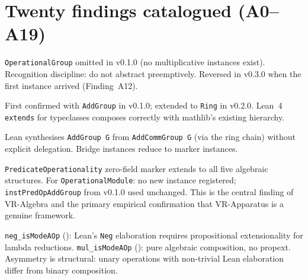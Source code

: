 \section{Twenty findings catalogued (A0--A19)}
\label{sec:algebra_findings}

\begin{finding}
\label{finding:A0}
\leanok
{}
\texttt{OperationalGroup} omitted in v0.1.0 (no multiplicative instances
exist).  Recognition discipline: do not abstract preemptively.
Reversed in v0.3.0 when the first instance arrived (Finding~A12).
\end{finding}

\begin{finding}
\label{finding:A1}
\leanok
First confirmed with \texttt{AddGroup} in v0.1.0;
extended to \texttt{Ring} in v0.2.0.
Lean~4 \texttt{extends} for typeclasses composes correctly with
mathlib's existing hierarchy.
\end{finding}

\begin{finding}[A2 --- \texttt{toAddGroup := inferInstance} resolves bridge]
\label{finding:A2}
\leanok
Lean synthesises \texttt{AddGroup G} from \texttt{AddCommGroup G} (via the
ring chain) without explicit delegation.  Bridge instances reduce to
marker instances.
\end{finding}

\begin{finding}
\label{finding:A3}
\leanok
{}
\texttt{PredicateOperationality} zero-field marker extends to all five
algebraic structures.  For \texttt{OperationalModule}: no new instance
registered; \texttt{instPredOpAddGroup} from v0.1.0 used unchanged.
This is the central finding of VR-Algebra and the primary empirical
confirmation that VR-Apparatus is a genuine framework.
\end{finding}

\begin{finding}
\label{finding:A4}
\leanok
{}
\texttt{neg\_isModeAOp} (\axiomprofile{[propext]}): Lean's \texttt{Neg}
elaboration requires propositional extensionality for lambda reductions.
\texttt{mul\_isModeAOp} (\axiomprofile{[]}): pure algebraic composition,
no propext.  Asymmetry is structural: unary operations with non-trivial
Lean elaboration differ from binary composition.
\end{finding}

